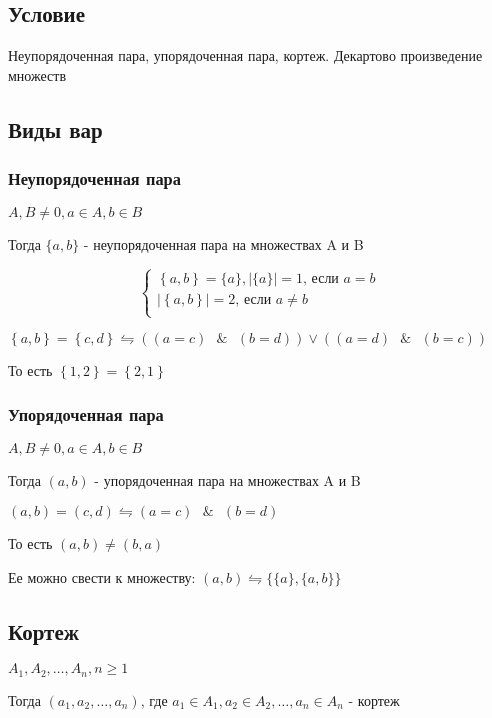 \documentclass{report}
\newcommand{\band}{\mbox{ } \& \mbox{ }}
\begin{document}
\subsection{Условие}
Неупорядоченная пара, упорядоченная пара, кортеж. Декартово произведение множеств

\subsection{Виды вар}
\subsubsection{Неупорядоченная пара}
$A, B \neq 0, a \in A, b \in B$

Тогда $\{a,b\}$ - неупорядоченная пара на множествах A и B


$$
    \begin{cases}
        \left\{a,b\right\} = \{a\},|\{a\}| = 1 \mbox{, если $a = b$} \\
        |\left\{a,b\right\}| = 2 \mbox{, если $a \neq b$}            \\
    \end{cases}
$$

$\left\{a,b\right\} = \left\{c,d\right\} \leftrightharpoons ((a = c) \band (b = d)) \lor ((a = d) \band (b = c))$

То есть $\left\{1,2\right\} = \left\{2,1\right\}$

\subsubsection{Упорядоченная пара}
$A, B \neq 0, a \in A, b \in B$

Тогда $(a,b)$ - упорядоченная пара на множествах A и B

$(a,b) = (c,d) \leftrightharpoons (a = c) \band (b = d)$

То есть $(a,b) \neq (b,a)$


Ее можно свести к множеству: $(a,b) \leftrightharpoons \{\{a\}, \{a,b\}\}$

\subsection{Кортеж}
$A_1,A_2,\ldots,A_n, n \geq 1$

Тогда $(a_1,a_2,\ldots,a_n)$, где $a_1 \in A_1, a_2 \in A_2, \ldots, a_n \in A_n$ - кортеж
\end{document}

